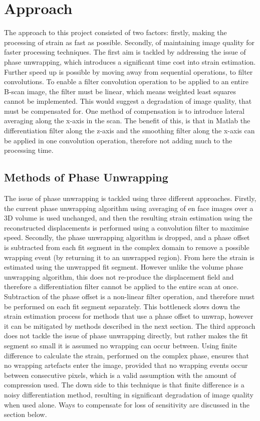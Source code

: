 \chapter{Approach}
The approach to this project consisted of two factors: firstly, making the processing of strain as fast as possible. Secondly, of maintaining image quality for faster processing techniques. The first aim is tackled by addressing the issue of phase unwrapping, which introduces a significant time cost into strain estimation. Further speed up is possible by moving away from sequential operations, to filter convolutions. 
To enable a filter convolution operation to be applied to an entire B-scan image, the filter must be linear, which means weighted least squares cannot be implemented. This would suggest a degradation of image quality, that must be compensated for. One method of compensation is to introduce lateral averaging along the x-axis in the scan. The benefit of this, is that in Matlab the differentiation filter along the z-axis and the smoothing filter along the x-axis can be applied in one convolution operation, therefore not adding much to the processing time.

\section{Methods of Phase Unwrapping}
The issue of phase unwrapping is tackled using three different approaches. Firstly, the current phase unwrapping algorithm using averaging of en face images over a 3D volume is used unchanged, and then the resulting strain estimation using the reconstructed displacements is performed using a convolution filter to maximise speed. 
Secondly, the phase unwrapping algorithm is dropped, and a phase offset is subtracted from each fit segment in the complex domain to remove a possible wrapping event (by returning it to an unwrapped region). From here the strain is estimated using the unwrapped fit segment. However unlike the volume phase unwrapping algorithm, this does not re-produce the displacement field and therefore a differentiation filter cannot be applied to the entire scan at once. Subtraction of the phase offset is a non-linear filter operation, and therefore must be performed on each fit segment separately. This bottleneck slows down the strain estimation process for methods that use a phase offset to unwrap, however it can be mitigated by methods described in the next section.
The third approach does not tackle the issue of phase unwrapping directly, but rather makes 
the fit segment so small it is assumed no wrapping can occur between. Using finite difference to calculate the strain, performed on the complex phase, ensures that no wrapping artefacts enter the image, provided that no wrapping events occur between consecutive pixels, which is a valid assumption with the amount of compression used. The down side to this technique is that finite difference is a noisy differentiation method, resulting in significant degradation of image quality when used alone. Ways to compensate for loss of sensitivity are discussed in the section below.

